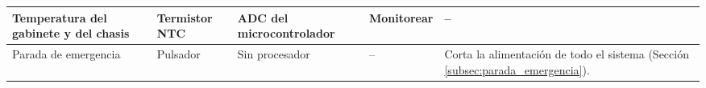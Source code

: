 \documentclass[../../General.tex]{subfiles}
\begin{document}
\begin{center}
\begin{xltabular}{\textwidth}{|p{2.8cm}|p{2.6cm}|p{2.4cm}|>{\centering\arraybackslash}p{2.0cm}|>{\raggedright\arraybackslash}X|}
        Temperatura del gabinete y del chasis & Termistor NTC & ADC del microcontrolador & Monitorear & -- \\ \hline
        Parada de emergencia & Pulsador & Sin procesador & -- & Corta la alimentación de todo el sistema (Sección \ref{subsec:parada_emergencia}). \\ \hline
    \end{xltabular}
\end{center}
\end{document}
